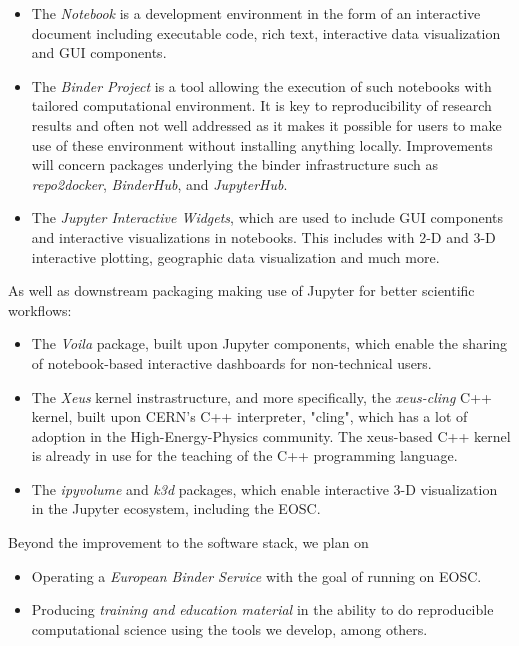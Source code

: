 \begin{itemize}
\item The \emph{Notebook} is a development environment in the form of an
interactive document including executable code, rich text, interactive data
visualization and GUI components.
\item The \emph{Binder Project} is a tool allowing the execution of such
notebooks with tailored computational environment. It is key to reproducibility
of research results and often not well addressed as it makes it possible for
users to make use of these environment without installing anything locally.
Improvements will concern packages underlying the binder infrastructure such
as \emph{repo2docker}, \emph{BinderHub}, and \emph{JupyterHub}.
\item The \emph{Jupyter Interactive Widgets}, which are used to include GUI
components and interactive visualizations in notebooks. This includes with 2-D
and 3-D interactive plotting, geographic data visualization and much more.
\end{itemize}

As well as downstream packaging making use of Jupyter for better scientific
workflows:

\begin{itemize}
\item The \emph{Voila} package, built upon Jupyter components, which enable the
sharing of notebook-based interactive dashboards for non-technical users.
\item The \emph{Xeus} kernel instrastructure, and more specifically, the
\emph{xeus-cling} C++ kernel, built upon CERN's C++ interpreter, "cling",
which has a lot of adoption in the High-Energy-Physics community. The
xeus-based C++ kernel is already in use for the teaching of the C++ programming
language.
\item The \emph{ipyvolume} and \emph{k3d} packages, which enable interactive
3-D visualization in the Jupyter ecosystem, including the EOSC.
\end{itemize}

Beyond the improvement to the software stack, we plan on 

\begin{itemize}
\item Operating a \emph{European Binder Service} with the goal of running on EOSC.
\item Producing \emph{training and education material} in the ability to do
reproducible computational science using the tools we develop, among others.
\end{itemize}

\clearpage

